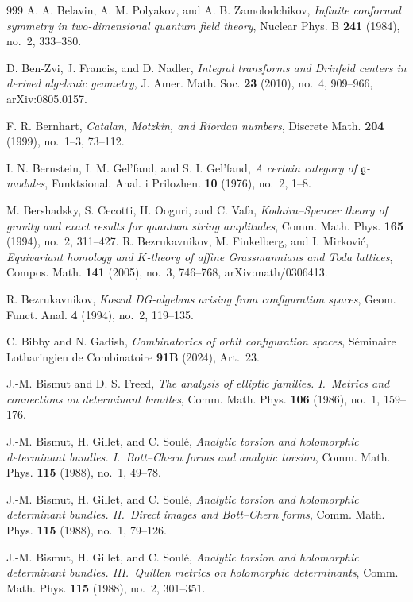 \begin{thebibliography}{999}
A. A. Belavin, A. M. Polyakov, and A. B. Zamolodchikov, \emph{Infinite conformal symmetry in two-dimensional quantum field theory}, Nuclear Phys. B \textbf{241} (1984), no.~2, 333--380.

D. Ben-Zvi, J. Francis, and D. Nadler, \emph{Integral transforms and Drinfeld centers in derived algebraic geometry}, J. Amer. Math. Soc. \textbf{23} (2010), no.~4, 909--966, arXiv:0805.0157.

F. R. Bernhart, \emph{Catalan, Motzkin, and Riordan numbers}, Discrete Math. \textbf{204} (1999), no.~1--3, 73--112.

I. N. Bernstein, I. M. Gel'fand, and S. I. Gel'fand, \emph{A certain category of $\mathfrak{g}$-modules}, Funktsional. Anal. i Prilozhen. \textbf{10} (1976), no.~2, 1--8.

M. Bershadsky, S. Cecotti, H. Ooguri, and C. Vafa, \emph{Kodaira--Spencer theory of gravity and exact results for quantum string amplitudes}, Comm. Math. Phys. \textbf{165} (1994), no.~2, 311--427.
R. Bezrukavnikov, M. Finkelberg, and I. Mirkovi\'{c}, \emph{Equivariant homology and $K$-theory of affine Grassmannians and Toda lattices}, Compos. Math. \textbf{141} (2005), no.~3, 746--768, arXiv:math/0306413.

R. Bezrukavnikov, \emph{Koszul DG-algebras arising from configuration spaces}, Geom. Funct. Anal. \textbf{4} (1994), no.~2, 119--135.


C. Bibby and N. Gadish, \emph{Combinatorics of orbit configuration spaces}, S\'eminaire Lotharingien de Combinatoire \textbf{91B} (2024), Art.~23.

J.-M. Bismut and D. S. Freed, \emph{The analysis of elliptic families. I.\ Metrics and connections on determinant bundles}, Comm. Math. Phys. \textbf{106} (1986), no.~1, 159--176.

J.-M. Bismut, H. Gillet, and C. Soul\'e, \emph{Analytic torsion and holomorphic determinant bundles. I.\ Bott--Chern forms and analytic torsion}, Comm. Math. Phys. \textbf{115} (1988), no.~1, 49--78.

J.-M. Bismut, H. Gillet, and C. Soul\'e, \emph{Analytic torsion and holomorphic determinant bundles. II.\ Direct images and Bott--Chern forms}, Comm. Math. Phys. \textbf{115} (1988), no.~1, 79--126.

J.-M. Bismut, H. Gillet, and C. Soul\'e, \emph{Analytic torsion and holomorphic determinant bundles. III.\ Quillen metrics on holomorphic determinants}, Comm. Math. Phys. \textbf{115} (1988), no.~2, 301--351.


\end{thebibliography}
